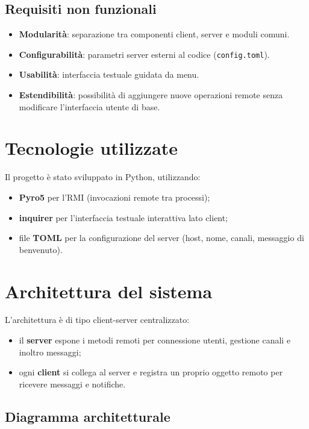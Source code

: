 \documentclass[11pt,a4paper]{article}
\begin{document}
\subsection{Requisiti non funzionali}
\begin{itemize}
  \item \textbf{Modularità}: separazione tra componenti client, server e moduli comuni.
  \item \textbf{Configurabilità}: parametri server esterni al codice (\texttt{config.toml}).
  \item \textbf{Usabilità}: interfaccia testuale guidata da menu.
  \item \textbf{Estendibilità}: possibilità di aggiungere nuove operazioni remote senza modificare l'interfaccia utente di base.
\end{itemize}

\section{Tecnologie utilizzate}
Il progetto è stato sviluppato in Python, utilizzando:
\begin{itemize}
  \item \textbf{Pyro5} per l'RMI (invocazioni remote tra processi);
  \item \textbf{inquirer} per l'interfaccia testuale interattiva lato client;
  \item file \textbf{TOML} per la configurazione del server (host, nome, canali, messaggio di benvenuto).
\end{itemize}

\section{Architettura del sistema}
L'architettura è di tipo client-server centralizzato:
\begin{itemize}
  \item il \textbf{server} espone i metodi remoti per connessione utenti, gestione canali e inoltro messaggi;
  \item ogni \textbf{client} si collega al server e registra un proprio oggetto remoto per ricevere messaggi e notifiche.
\end{itemize}

\subsection{Diagramma architetturale}
\end{document}
